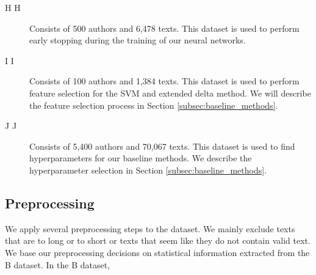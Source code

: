 \begin{description}
    \item[\glsdesc{H} \gls{H}]

        Consists of 500 authors and 6,478 texts. This dataset is used to perform
        early stopping during the training of our neural networks.

    \item[\glsdesc{I} \gls{I}]

        Consists of 100 authors and 1,384 texts. This dataset is used to
        perform feature selection for the \gls{SVM} and extended delta
        method. We will describe the feature selection process in Section
        \ref{subsec:baseline_methods}.

    \item[\glsdesc{J} \gls{J}]

        Consists of 5,400 authors and 70,067 texts. This dataset is used to find
        hyperparameters for our baseline methods. We describe the hyperparameter
        selection in Section \ref{subsec:baseline_methods}.

\end{description}


\subsection{Preprocessing}

We apply several preprocessing steps to the dataset. We mainly exclude texts
that are to long or to short or texts that seem like they do not contain valid
text. We base our preprocessing decisions on statistical information extracted
from the B dataset. In the B dataset,

